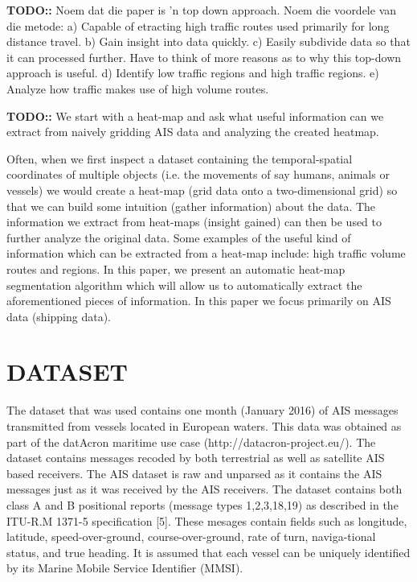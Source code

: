 \documentclass{article}
\begin{document}
\textbf{TODO::} Noem dat die paper is 'n top down approach. Noem die voordele van die metode:
a) Capable of etracting high traffic routes used primarily for long distance travel. b) Gain insight into data quickly. c) Easily subdivide data so that it can processed
further. Have to think of more reasons as to why this top-down approach is useful. d) Identify low traffic regions and high traffic regions. e) Analyze how traffic makes 
use of high volume routes.

\textbf{TODO::} We start with a heat-map and ask what useful information can we extract from naively gridding AIS data and analyzing the created heatmap.

Often, when we first inspect a dataset containing the temporal-spatial coordinates of multiple objects (i.e. the movements of say humans, animals or vessels)
we would create a heat-map (grid data onto a two-dimensional grid) so that we can build some intuition (gather information) about the data.
The information we extract from heat-maps (insight gained) can then be used to further analyze the original data. Some examples of the useful kind of information which can be extracted from a 
heat-map include: high traffic volume routes and regions. In this paper, we present an automatic heat-map segmentation algorithm which will allow us to automatically extract the 
 aforementioned pieces of information. In this paper we focus primarily on AIS data (shipping data). 
 
\section{DATASET}
The dataset that was used contains one month (January 2016) of AIS messages transmitted from vessels located in European waters. This data was
obtained as part of the datAcron maritime use case (http://datacron-project.eu/).  
The dataset contains messages recoded by both terrestrial as well as satellite AIS based receivers. The AIS dataset is raw and unparsed as it contains the AIS messages 
just as it was received by the AIS receivers. The dataset contains both class A and B positional reports (message types 1,2,3,18,19)
as described in the ITU-R.M 1371-5 specification [5]. These mesages contain fields such as longitude, latitude,
speed-over-ground, course-over-ground, rate of turn, naviga-tional status, and true heading. It is assumed that each vessel
can be uniquely identified by its Marine Mobile Service Identifier (MMSI). 
\end{document}
